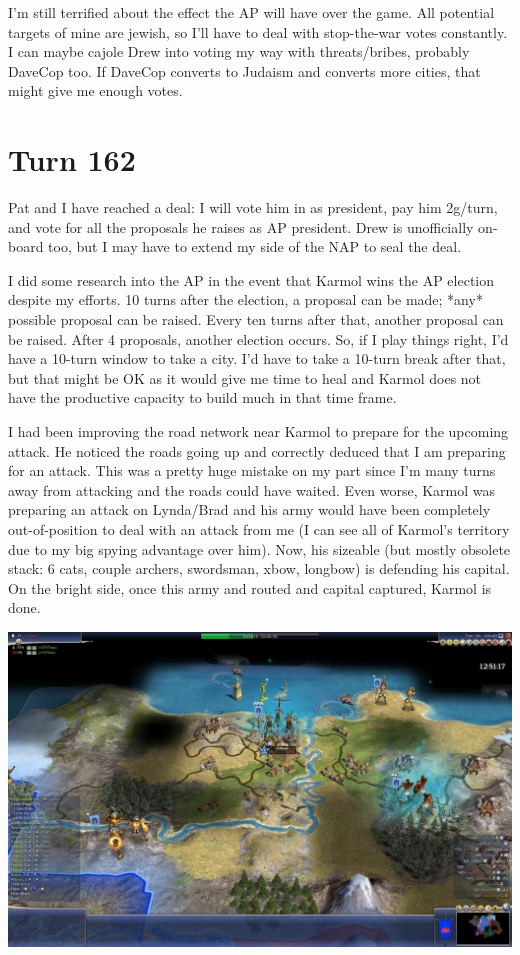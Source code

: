 \documentclass[10pt]{article}
\begin{document}
I'm still terrified about the effect the AP will have over the
game. All potential targets of mine are jewish, so I'll have to deal
with stop-the-war votes constantly. I can maybe cajole Drew into
voting my way with threats/bribes, probably DaveCop too. If DaveCop
converts to Judaism and converts more cities, that might give me
enough votes.

\section*{Turn 162}

Pat and I have reached a deal: I will vote him in as president, pay
him 2g/turn, and vote for all the proposals he raises as AP
president. Drew is unofficially on-board too, but I may have to extend
my side of the NAP to seal the deal.

I did some research into the AP in the event that Karmol wins the AP
election despite my efforts. 10 turns after the election, a proposal
can be made; *any* possible proposal can be raised. Every ten turns
after that, another proposal can be raised. After 4 proposals, another
election occurs. So, if I play things right, I'd have a 10-turn window
to take a city. I'd have to take a 10-turn break after that, but that
might be OK as it would give me time to heal and Karmol does not have
the productive capacity to build much in that time frame.

I had been improving the road network near Karmol to prepare for the
upcoming attack. He noticed the roads going up and correctly deduced
that I am preparing for an attack. This was a pretty huge mistake on
my part since I'm many turns away from attacking and the roads could
have waited. Even worse, Karmol was preparing an attack on Lynda/Brad
and his army would have been completely out-of-position to deal with
an attack from me (I can see all of Karmol's territory due to my big
spying advantage over him). Now, his sizeable (but mostly obsolete
stack: 6 cats, couple archers, swordsman, xbow, longbow) is defending
his capital. On the bright side, once this army and routed and capital
captured, Karmol is done.

\includegraphics[width=1.0\textwidth]{turn164}
\end{document}
